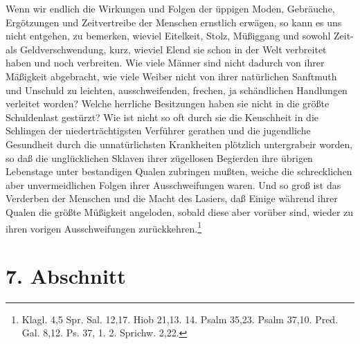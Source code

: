 Wenn wir endlich die Wirkungen und Folgen der üppigen Moden, Gebräuche,
Ergötzungen und Zeitvertreibe der Menschen ernstlich erwägen, so kann es uns
nicht entgehen, zu bemerken, wieviel Eitelkeit, Stolz, Müßiggang und sowohl
Zeit- als Geldverschwendung, kurz, wieviel Elend sie schon in der Welt
verbreitet haben und noch verbreiten. Wie viele Männer sind nicht dadurch von
ihrer Mäßigkeit abgebracht, wie viele Weiber nicht von ihrer natürlichen
Sanftmuth und Unschuld zu leichten, ausschweifenden, frechen, ja schändlichen
Handlungen verleitet worden? Welche herrliche Besitzungen haben sie nicht in die
größte Schuldenlast gestürzt? Wie ist nicht so oft durch sie die Keuschheit in
die Schlingen der niederträchtigsten Verführer gerathen und die jugendliche
Gesundheit durch die unnatürlichsten Krankheiten plötzlich untergrabeir worden,
so daß die unglücklichen Sklaven ihrer zügellosen Begierden ihre übrigen
Lebenstage unter bestandigen Qualen zubringen mußten, weiche die schrecklichen
aber unvermeidlichen Folgen ihrer Ausschweifungen waren. Und so groß ist das
Verderben der Menschen und die Macht des Lasiers, daß Einige während ihrer
Qualen die größte Müßigkeit angeloden, sobald diese aber vorüber sind, wieder zu
ihren vorigen Ausschweifungen zurückkehren.\footnote{Klagl. 4,5 Spr. Sal. 12,17.
Hiob 21,13. 14. Psalm 35,23. Psalm 37,10. Pred. Gal. 8,12. Ps. 37, 1. 2.
Sprichw. 2,22.}

\section{7. Abschnitt}

